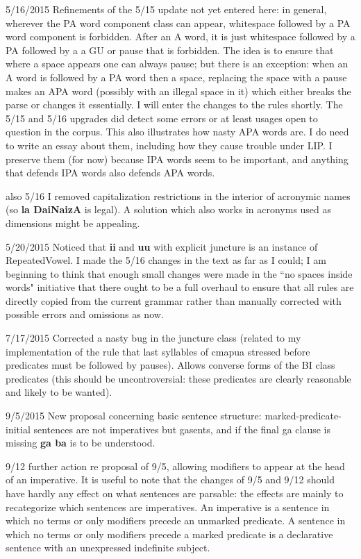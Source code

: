 \documentclass[12pt]{article}
\begin{document}
5/16/2015  Refinements of the 5/15 update not yet entered here:  in general, wherever the PA word component
class can appear, whitespace followed by a PA word component is forbidden.   After an A word, it is just whitespace followed
by a PA followed by a a GU or pause that is forbidden.  The idea is to ensure that where a space appears one can always pause; but there is an exception:  when an A word is followed by a PA word then a space, replacing the space with a pause makes an APA word (possibly with an illegal space in it) which either breaks the parse or changes it essentially.   I will enter the changes to the rules shortly.  The 5/15 and 5/16 upgrades did detect some errors or at least usages open to question in the corpus.   This also illustrates how nasty APA words are.   I do need to write an essay about them, including how they cause trouble under LIP.   I preserve them (for now) because IPA words seem to be important, and anything that defends IPA words
also defends APA words.

also 5/16 I removed capitalization restrictions in the interior of acronymic names (so {\bf la DaiNaizA} is legal).   A solution which also works in acronyms used as dimensions might be appealing.

5/20/2015  Noticed that {\bf ii} and {\bf uu} with explicit juncture is an instance of RepeatedVowel.  I made the 5/16 changes in the text as far as I could; I am beginning to think
that enough small changes were made in the ``no spaces inside words" initiative that there ought to be a full overhaul to ensure that all rules are directly copied from the current
grammar rather than manually corrected with possible errors and omissions as now.

7/17/2015   Corrected a nasty bug in the juncture class (related to my implementation of the rule that last syllables of cmapua stressed before predicates must be
followed by pauses).  Allows converse forms of the BI class predicates (this should be uncontroversial:  these predicates are clearly reasonable and likely to be wanted).

9/5/2015  New proposal concerning basic sentence structure:  marked-predicate-initial sentences are not imperatives but gasents, and if the final ga clause is missing
{\bf ga ba} is to be understood.

9/12 further action re proposal of 9/5, allowing modifiers to appear at the head of an imperative.  It is useful to note that the changes of 9/5 and 9/12 should have hardly any effect on what sentences are parsable:  the effects are mainly to recategorize which sentences are imperatives.   An imperative is a sentence in which no terms or only modifiers precede an unmarked predicate.  A sentence in which no terms or only modifiers precede a marked predicate is a declarative sentence with an unexpressed indefinite subject.
\end{document}
